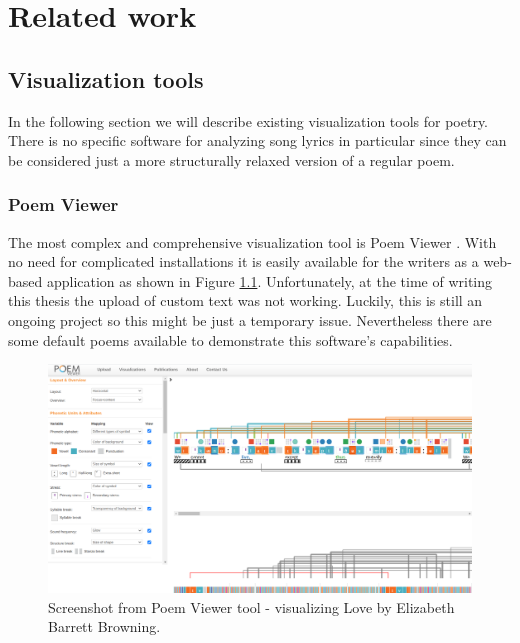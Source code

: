 \chapter{Related work}



\section{Visualization tools}
In the following section we will describe existing visualization tools for poetry. There is no specific software for analyzing song lyrics in particular since they can be considered just a more structurally relaxed version of a regular poem.
\subsection{Poem Viewer}
The most complex and comprehensive visualization tool is Poem Viewer \cite{Abdul2013}. With no need for complicated installations it is easily available for the writers as a web-based application as shown in Figure \ref{screenshotPV}. Unfortunately, at the time of writing this thesis the upload of custom text was not working. Luckily, this is still an ongoing project so this might be just a temporary issue. Nevertheless there are some default poems available to demonstrate this software's capabilities.
\begin{figure}[h]\centering
	\includegraphics[scale=0.24]{../img/ScreenshotPV.png}
	\caption{Screenshot from Poem Viewer tool - visualizing Love by Elizabeth Barrett Browning.}\label{screenshotPV}
\end{figure}

